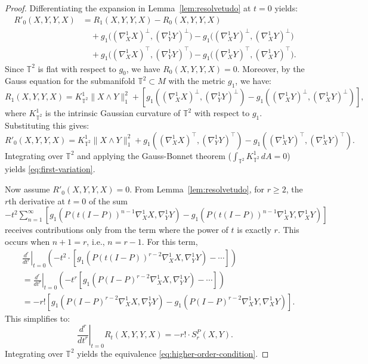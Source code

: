 \documentclass[graybox]{svmult}
\begin{document}
\begin{proof}
Differentiating the expansion in Lemma~\ref{lem:resolvetudo} at $t=0$ yields:
\begin{align*}
R'_0(X,Y,Y,X) &= R_1(X,Y,Y,X) - R_0(X,Y,Y,X) \\
&\quad + g_1\bigl((\nabla^1_X X)^\perp, (\nabla^1_Y Y)^\perp\bigr) 
   - g_1\bigl((\nabla^1_X Y)^\perp, (\nabla^1_X Y)^\perp\bigr) \\
&\quad + g_1\bigl((\nabla^1_X X)^\top, (\nabla^1_Y Y)^\top\bigr) 
   - g_1\bigl((\nabla^1_X Y)^\top, (\nabla^1_X Y)^\top\bigr).
\end{align*}
Since $\mathbb{T}^2$ is flat with respect to $g_0$, we have $R_0(X,Y,Y,X)=0$. Moreover, by the Gauss equation for the submanifold $\mathbb{T}^2 \subset M$ with the metric $g_1$, we have:
\[
R_1(X,Y,Y,X) = K^1_{\mathbb{T}^2} \|X\wedge Y\|_1^2 + \left[g_1((\nabla^1_X X)^\perp, (\nabla^1_Y Y)^\perp) - g_1((\nabla^1_X Y)^\perp, (\nabla^1_X Y)^\perp)\right],
\]
where $K^1_{\mathbb{T}^2}$ is the intrinsic Gaussian curvature of $\mathbb{T}^2$ with respect to $g_1$. Substituting this gives:
\[
R'_0(X,Y,Y,X) = K^1_{\mathbb{T}^2} \|X\wedge Y\|_1^2 + g_1((\nabla^1_X X)^\top, (\nabla^1_Y Y)^\top) - g_1((\nabla^1_X Y)^\top, (\nabla^1_X Y)^\top).
\]
Integrating over $\mathbb{T}^2$ and applying the Gauss-Bonnet theorem ($\int_{\mathbb{T}^2} K^1_{\mathbb{T}^2} \, dA = 0$) yields \eqref{eq:first-variation}.

Now assume $R'_0(X,Y,Y,X)=0$. From Lemma~\ref{lem:resolvetudo}, for $r \geq 2$, the $r$th derivative at $t=0$ of the sum $ -t^2\sum_{n=1}^\infty \left[g_1(P(t(I-P))^{n-1}\nabla^1_X X, \nabla^1_Y Y) - g_1(P(t(I-P))^{n-1}\nabla^1_X Y, \nabla^1_X Y)\right] $ receives contributions only from the term where the power of $t$ is exactly $r$. This occurs when $n+1 = r$, i.e., $n = r-1$. For this term,
\begin{align*}
&\left.\frac{d^r}{dt^r}\right|_{t=0} \left( -t^2 \cdot \left[g_1(P(t(I-P))^{r-2}\nabla^1_X X, \nabla^1_Y Y) - \cdots \right] \right) \\
&= \left.\frac{d^r}{dt^r}\right|_{t=0} \left( -t^{r} \left[g_1(P(I-P)^{r-2}\nabla^1_X X, \nabla^1_Y Y) - \cdots \right] \right) \\
&= -r! \left[g_1(P(I-P)^{r-2}\nabla^1_X X, \nabla^1_Y Y) - g_1(P(I-P)^{r-2}\nabla^1_X Y, \nabla^1_X Y)\right].
\end{align*}
This simplifies to:
\[
\left.\frac{d^r}{dt^r}\right|_{t=0} R_t(X,Y,Y,X) = -r! \cdot S_r^P(X,Y).
\]
Integrating over $\mathbb{T}^2$ yields the equivalence \eqref{eq:higher-order-condition}.
\end{proof}
\end{document}
